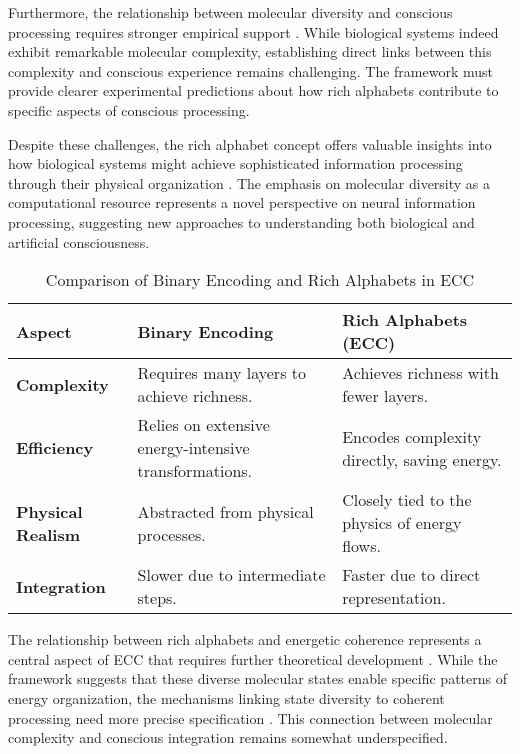 \begin{refsection}
Furthermore, the relationship between molecular diversity and conscious processing requires stronger empirical support \cite{noe2009out}. While biological systems indeed exhibit remarkable molecular complexity, establishing direct links between this complexity and conscious experience remains challenging. The framework must provide clearer experimental predictions about how rich alphabets contribute to specific aspects of conscious processing.

Despite these challenges, the rich alphabet concept offers valuable insights into how biological systems might achieve sophisticated information processing through their physical organization \cite{chalmers2010character}. The emphasis on molecular diversity as a computational resource represents a novel perspective on neural information processing, suggesting new approaches to understanding both biological and artificial consciousness.

\begin{table}[h!]
\centering
\begin{tabularx}{\textwidth}{@{}lXl@{}}
\toprule
\textbf{Aspect}            & \textbf{Binary Encoding}                  & \textbf{Rich Alphabets (ECC)}         \\ \midrule
\textbf{Complexity}        & Requires many layers to achieve richness. & Achieves richness with fewer layers.  \\
\textbf{Efficiency}        & Relies on extensive energy-intensive transformations. & Encodes complexity directly, saving energy. \\
\textbf{Physical Realism}  & Abstracted from physical processes.       & Closely tied to the physics of energy flows. \\
\textbf{Integration}       & Slower due to intermediate steps.         & Faster due to direct representation.  \\ \bottomrule
\end{tabularx}
\caption{Comparison of Binary Encoding and Rich Alphabets in ECC}
\label{tab:binary_vs_rich}
\end{table}

The relationship between rich alphabets and energetic coherence represents a central aspect of ECC that requires further theoretical development \cite{deacon2011incomplete}. While the framework suggests that these diverse molecular states enable specific patterns of energy organization, the mechanisms linking state diversity to coherent processing need more precise specification \cite{koch2019feeling}. This connection between molecular complexity and conscious integration remains somewhat underspecified.


\end{refsection}
